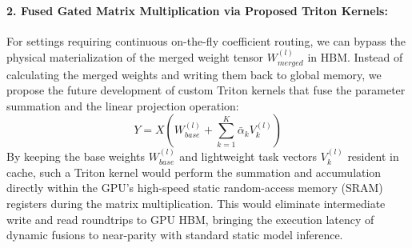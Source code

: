 \paragraph{2. Fused Gated Matrix Multiplication via Proposed Triton Kernels:}
For settings requiring continuous on-the-fly coefficient routing, we can bypass the physical materialization of the merged weight tensor $W_{merged}^{(l)}$ in HBM. Instead of calculating the merged weights and writing them back to global memory, we propose the future development of custom Triton kernels that fuse the parameter summation and the linear projection operation:
\begin{equation}
    Y = X \left( W_{base}^{(l)} + \sum_{k=1}^K \bar{\alpha}_k V_k^{(l)} \right)
\end{equation}
By keeping the base weights $W_{base}^{(l)}$ and lightweight task vectors $V_k^{(l)}$ resident in cache, such a Triton kernel would perform the summation and accumulation directly within the GPU's high-speed static random-access memory (SRAM) registers during the matrix multiplication. This would eliminate intermediate write and read roundtrips to GPU HBM, bringing the execution latency of dynamic fusions to near-parity with standard static model inference.
